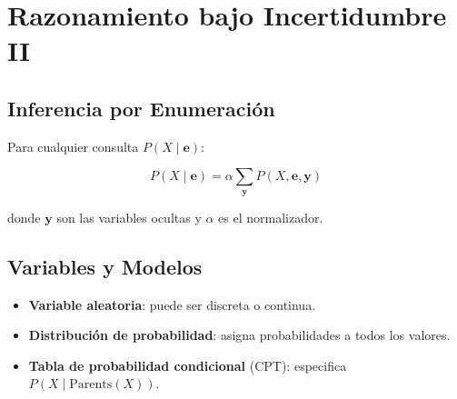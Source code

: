 \section{Razonamiento bajo Incertidumbre II}

\subsection{Inferencia por Enumeración}

Para cualquier consulta $P(X \mid \mathbf{e})$:

$$P(X \mid \mathbf{e}) = \alpha \sum_{\mathbf{y}} P(X, \mathbf{e}, \mathbf{y})$$

donde $\mathbf{y}$ son las variables ocultas y $\alpha$ es el normalizador.

\subsection{Variables y Modelos}

\begin{itemize}
    \item \textbf{Variable aleatoria}: puede ser discreta o continua.
    \item \textbf{Distribución de probabilidad}: asigna probabilidades a todos los valores.
    \item \textbf{Tabla de probabilidad condicional} (CPT): especifica $P(X \mid \text{Parents}(X))$.
\end{itemize}

